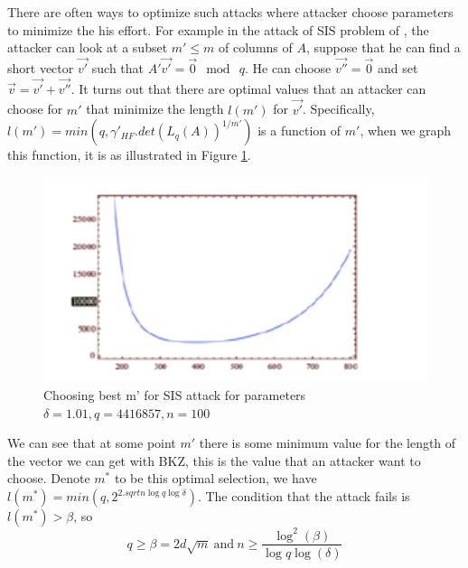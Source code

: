 \begin{description}
            There are often ways to optimize such attacks where attacker choose
            parameters to minimize the his effort. For example in the attack of
            SIS problem of \cite{micciancio2008lattice}, the attacker can look at a subset
            $m' \leq m$ of columns of $A$, suppose that he can find a short
            vector $\vec{v'}$ such that $A'\vec{v'} = \vec{0} \mod \ q$. He can
            choose $\vec{v''} = \vec{0}$ and set $\vec{v} = \vec{v'} +
            \vec{v''}$.
            It turns out that there are optimal values that an attacker can
            choose for $m'$ that minimize the length $l(m')$ for $\vec{v'}$.
            Specifically, $l(m') = min(q,\gamma'_{HF}.det(L_q(A))^{1/m'})$ is a
            function of $m'$, when
            we graph this function, it is as illustrated in Figure
            \ref{fig:bestAttack}.
            \begin{figure}[h]
                \centering
                \includegraphics[scale=0.3]{bestattack}
                \caption{Choosing best m' for SIS attack for parameters
                $\delta = 1.01, q=4416857, n=100$}
                \label{fig:bestAttack}
            \end{figure}
            We can see that at some point $m'$ there is some minimum value for the
            length of the vector we can get with BKZ, this is the value that an
            attacker want to choose. Denote $m^*$ to be this optimal selection, we
            have $l(m^*) = min(q, 2^{2.sqrt{n\log q\log \delta}})$. The
            condition that the attack fails is $l(m^*) > \beta$, so
            \[
                q \geq \beta = 2d\sqrt{m} \  \text{and}\ n \geq
                \frac{\log^2(\beta)}{\log q \log(\delta)}
            \]


\end{description}
